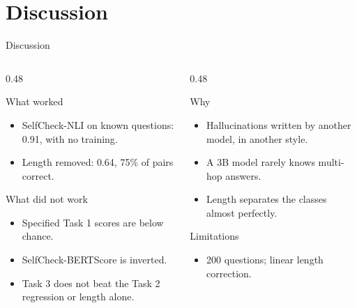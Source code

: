 \documentclass[aspectratio=169,10pt]{beamer}
\begin{document}
\section{Discussion}

\begin{frame}{Discussion}
\small
\begin{columns}[T]
\begin{column}{0.48\textwidth}
\begin{block}{What worked}
\begin{itemize}
  \item SelfCheck-NLI on known questions: 0.91, with no training.
  \item Length removed: 0.64, 75\% of pairs correct.
\end{itemize}
\end{block}
\begin{alertblock}{What did not work}
\begin{itemize}
  \item Specified Task 1 scores are below chance.
  \item SelfCheck-BERTScore is inverted.
  \item Task 3 does not beat the Task 2 regression or length alone.
\end{itemize}
\end{alertblock}
\end{column}
\begin{column}{0.48\textwidth}
\begin{block}{Why}
\begin{itemize}
  \item Hallucinations written by another model, in another style.
  \item A 3B model rarely knows multi-hop answers.
  \item Length separates the classes almost perfectly.
\end{itemize}
\end{block}
\begin{block}{Limitations}
\begin{itemize}
  \item 200 questions; linear length correction.
\end{itemize}
\end{block}
\end{column}
\end{columns}
\end{frame}
\end{document}
